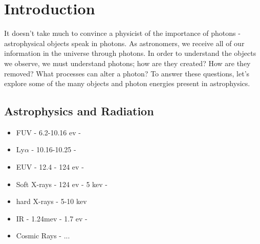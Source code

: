 \pagestyle{fancy}
\headheight 20pt
\chead{}
\lfoot{}
\cfoot{\thepage}
\rfoot{}
\renewcommand{\headrulewidth}{0.1pt}
\renewcommand{\footrulewidth}{0.1pt}

\chapter{Introduction}
\label{chap:intro} 
\thispagestyle{fancy} 

It doesn't take much to convince a physicist of the importance of photons - astrophysical objects speak in photons. As astronomers, we receive all of our information in the universe through photons. In order to understand the objects we observe, we must understand photons; how are they created? How are they removed? What processes can alter a photon? To answer these questions, let's explore some of the many objects and photon energies present in astrophysics.

\section{Astrophysics and Radiation}
\label{sec:astroandrad}



\begin{itemize}
\item FUV - 6.2-10.16 ev -
\item Ly$\alpha$ - 10.16-10.25 - 
\item EUV - 12.4 - 124 ev - 
\item Soft X-rays - 124 ev - 5 kev - 
\item hard X-rays - 5-10 kev
\item IR - 1.24mev - 1.7 ev - 
\item Cosmic Rays - ...
\end{itemize}




%

